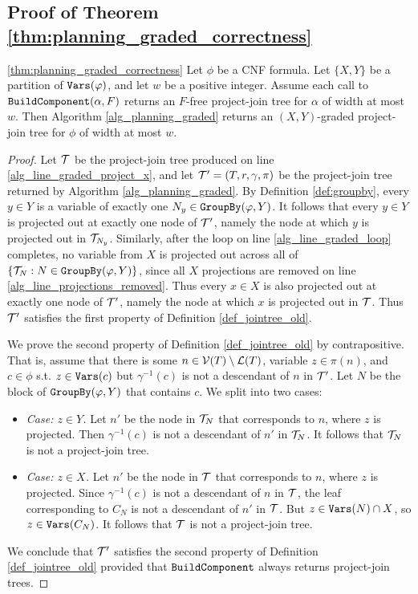\subsection{Proof of Theorem \ref{thm:planning_graded_correctness}}
\begin{theorem}{\ref{thm:planning_graded_correctness}}
Let $\phi$ be a CNF formula. 
Let $\{X, Y\}$ be a partition of $\texttt{\upshape Vars}(\varphi)$, and let $w$ be a positive integer. 
Assume each call to $\texttt{\upshape BuildComponent}(\alpha, F)$ returns an $F$-free project-join tree for $\alpha$ of width at most $w$. 
Then Algorithm \ref{alg_planning_graded} returns an $(X,Y)$-graded project-join tree for $\phi$ of width at most $w$.
\end{theorem}
\begin{proof}
Let $\mathcal{T}$ be the project-join tree produced on line \ref{alg_line_graded_project_x}, and let $\mathcal{T}' = (T, r, \gamma, \pi)$ be the project-join tree returned by Algorithm \ref{alg_planning_graded}. 
By Definition \ref{def:groupby}, every $y \in Y$ is a variable of exactly one $N_y \in \texttt{\upshape GroupBy}(\varphi, Y)$. It follows that every $y \in Y$ is projected out at exactly one node of $\mathcal{T}'$, namely the node at which $y$ is projected out in $\mathcal{T}_{N_y}$. Similarly, after the loop on line \ref{alg_line_graded_loop} completes, no variable from $X$ is projected out across all of $\{\mathcal{T}_N : N \in \texttt{\upshape GroupBy}(\varphi, Y)\}$, since all $X$ projections are removed on line \ref{alg_line_projections_removed}. Thus every $x \in X$ is also projected out at exactly one node of $\mathcal{T}'$, namely the node at which $x$ is projected out in $\mathcal{T}$. Thus $\mathcal{T}'$ satisfies the first property of Definition \ref{def_jointree_old}.

We prove the second property of Definition \ref{def_jointree_old} by contrapositive. That is, assume that there is some $n \in \mathcal{V}(T) \setminus \mathcal{L}(T)$, variable $z \in \pi(n)$, and $c \in \phi$ s.t. $z \in \texttt{\upshape Vars}(c)$ but $\gamma^{-1}(c)$ is not a descendant of $n$ in $\mathcal{T}'$. Let $N$ be the block of $\texttt{\upshape GroupBy}(\varphi, Y)$ that contains $c$. We split into two cases:
\begin{itemize}
    \item \textit{Case: $z \in Y$.} Let $n'$ be the node in $\mathcal{T}_N$ that corresponds to $n$, where $z$ is projected. Then $\gamma^{-1}(c)$ is not a descendant of $n'$ in $\mathcal{T}_N$. It follows that $\mathcal{T}_N$ is not a project-join tree.
    \item \textit{Case: $z \in X$.} Let $n'$ be the node in $\mathcal{T}$ that corresponds to $n$, where $z$ is projected. Since  $\gamma^{-1}(c)$ is not a descendant of $n$ in $\mathcal{T}$, the leaf corresponding to $C_N$ is not a descendant of $n'$ in $\mathcal{T}$. But $z \in \texttt{\upshape Vars}(N) \cap X$, so $z \in \texttt{\upshape Vars}(C_N)$. It follows that $\mathcal{T}$ is not a project-join tree. 
\end{itemize} 
We conclude that $\mathcal{T}'$ satisfies the second property of Definition \ref{def_jointree_old} provided that $\texttt{\upshape BuildComponent}$ always returns project-join trees.


\end{proof}
